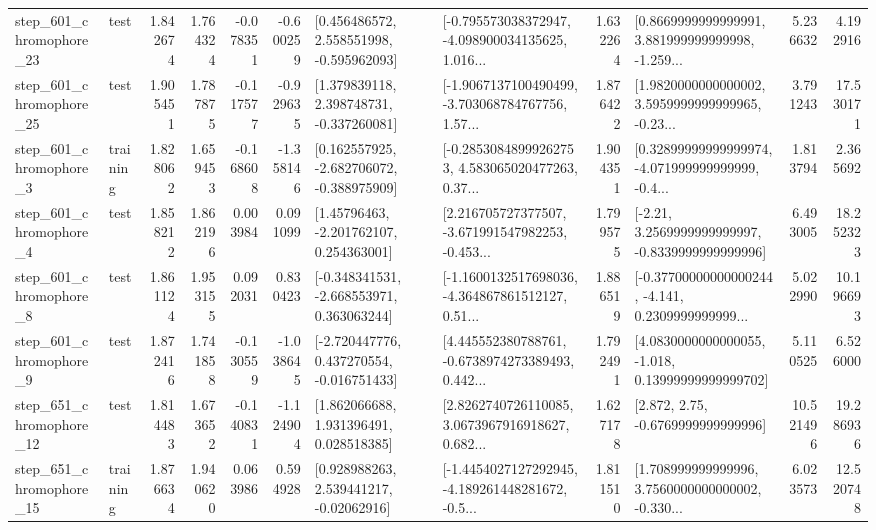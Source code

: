 \begin{tabular}{llrrrrllrlrr}
  step\_601\_chromophore\_23 &      test &      1.842674 &    1.764324 &     -0.078351 & -0.600259 &    [0.456486572, 2.558551998, -0.595962093] &  [-0.795573038372947, -4.098900034135625, 1.016... &       1.632264 &  [0.8669999999999991, 3.881999999999998, -1.259... &            5.236632 &          4.192916 \\
  step\_601\_chromophore\_25 &      test &      1.905451 &    1.787875 &     -0.117577 & -0.929635 &    [1.379839118, 2.398748731, -0.337260081] &  [-1.9067137100490499, -3.703068784767756, 1.57... &       1.876422 &  [1.9820000000000002, 3.5959999999999965, -0.23... &            3.791243 &         17.530171 \\
   step\_601\_chromophore\_3 &  training &      1.828062 &    1.659453 &     -0.168608 & -1.358146 &   [0.162557925, -2.682706072, -0.388975909] &  [-0.28530848999262753, 4.583065020477263, 0.37... &       1.904351 &  [0.32899999999999974, -4.071999999999999, -0.4... &            1.813794 &          2.365692 \\
   step\_601\_chromophore\_4 &      test &      1.858212 &    1.862196 &      0.003984 &  0.091099 &     [1.45796463, -2.201762107, 0.254363001] &  [2.216705727377507, -3.671991547982253, -0.453... &       1.799575 &   [-2.21, 3.2569999999999997, -0.8339999999999996] &            6.493005 &         18.252323 \\
   step\_601\_chromophore\_8 &      test &      1.861124 &    1.953155 &      0.092031 &  0.830423 &   [-0.348341531, -2.668553971, 0.363063244] &  [-1.1600132517698036, -4.364867861512127, 0.51... &       1.886519 &  [-0.37700000000000244, -4.141, 0.2309999999999... &            5.022990 &         10.196693 \\
   step\_601\_chromophore\_9 &      test &      1.872416 &    1.741858 &     -0.130559 & -1.038645 &   [-2.720447776, 0.437270554, -0.016751433] &  [4.445552380788761, -0.6738974273389493, 0.442... &       1.792491 &  [4.0830000000000055, -1.018, 0.13999999999999702] &            5.110525 &          6.526000 \\
  step\_651\_chromophore\_12 &      test &      1.814483 &    1.673652 &     -0.140831 & -1.124904 &     [1.862066688, 1.931396491, 0.028518385] &  [2.8262740726110085, 3.0673967916918627, 0.682... &       1.627178 &                 [2.872, 2.75, -0.6769999999999996] &           10.521496 &         19.286936 \\
  step\_651\_chromophore\_15 &  training &      1.876634 &    1.940620 &      0.063986 &  0.594928 &     [0.928988263, 2.539441217, -0.02062916] &  [-1.4454027127292945, -4.189261448281672, -0.5... &       1.811510 &  [1.708999999999996, 3.7560000000000002, -0.330... &            6.023573 &         12.520748 \\

\end{tabular}
